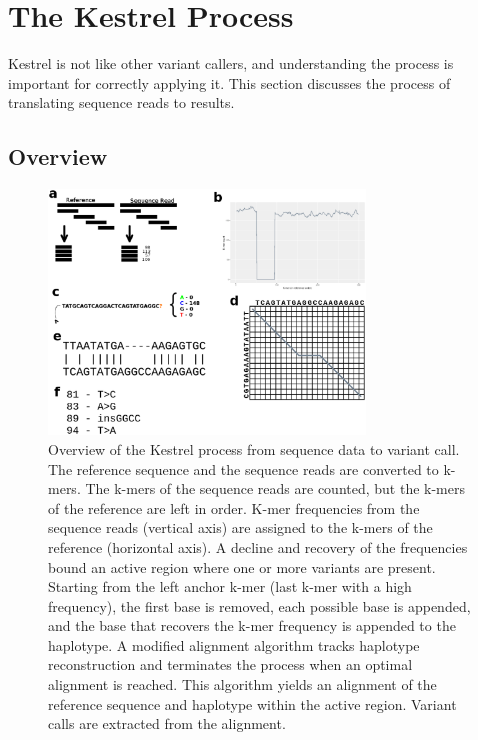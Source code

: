 
\section{The Kestrel Process}
\label{sec.process}

Kestrel is not like other variant callers, and understanding the process is important for correctly applying it. This section discusses the process of translating sequence reads to results.


\subsection{Overview}
\label{sec.process.overview}

\begin{figure}[H]
	
	\begin{center}
		\includegraphics[width=0.75\textwidth]{img/KestrelOverview}
	\end{center}
	
	\caption{Overview of the Kestrel process from sequence data to variant call.  The reference sequence and the sequence reads are converted to k-mers. The k-mers of the sequence reads are counted, but the k-mers of the reference are left in order.  K-mer frequencies from the sequence reads (vertical axis) are assigned to the k-mers of the reference (horizontal axis). A decline and recovery of the frequencies bound an active region where one or more variants are present.  Starting from the left anchor k-mer (last k-mer with a high frequency), the first base is removed, each possible base is appended, and the base that recovers the k-mer frequency is appended to the haplotype.  A modified alignment algorithm tracks haplotype reconstruction and terminates the process when an optimal alignment is reached.  This algorithm yields an alignment of the reference sequence and haplotype within the active region.  Variant calls are extracted from the alignment.}
	
	\label{fig.arillustration}
\end{figure}

